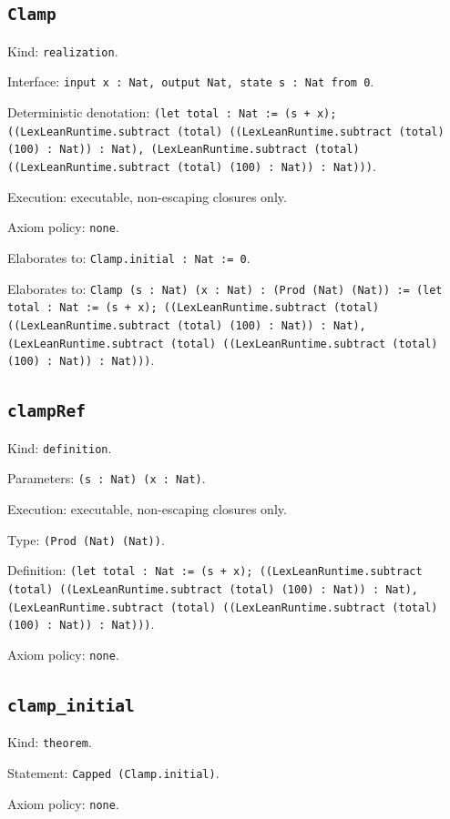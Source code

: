 \documentclass[11pt]{article}
\begin{document}
\subsection*{\texttt{Clamp}}
\noindent Kind: \texttt{realization}.\par
\noindent Interface: \texttt{input x : Nat, output Nat, state s : Nat from 0}.\par
\noindent Deterministic denotation: \texttt{(let total : Nat := (s + x); ((LexLeanRuntime.subtract (total) ((LexLeanRuntime.subtract (total) (100) : Nat)) : Nat), (LexLeanRuntime.subtract (total) ((LexLeanRuntime.subtract (total) (100) : Nat)) : Nat)))}.\par
\noindent Execution: executable, non-escaping closures only.\par
\noindent Axiom policy: \texttt{none}.\par
\noindent Elaborates to: \texttt{Clamp.initial : Nat := 0}.\par
\noindent Elaborates to: \texttt{Clamp (s : Nat) (x : Nat) : (Prod (Nat) (Nat)) := (let total : Nat := (s + x); ((LexLeanRuntime.subtract (total) ((LexLeanRuntime.subtract (total) (100) : Nat)) : Nat), (LexLeanRuntime.subtract (total) ((LexLeanRuntime.subtract (total) (100) : Nat)) : Nat)))}.\par
\subsection*{\texttt{clampRef}}
\noindent Kind: \texttt{definition}.\par
\noindent Parameters: \texttt{(s : Nat) (x : Nat)}.\par
\noindent Execution: executable, non-escaping closures only.\par
\noindent Type: \texttt{(Prod (Nat) (Nat))}.\par
\noindent Definition: \texttt{(let total : Nat := (s + x); ((LexLeanRuntime.subtract (total) ((LexLeanRuntime.subtract (total) (100) : Nat)) : Nat), (LexLeanRuntime.subtract (total) ((LexLeanRuntime.subtract (total) (100) : Nat)) : Nat)))}.\par
\noindent Axiom policy: \texttt{none}.\par
\subsection*{\texttt{clamp\_initial}}
\noindent Kind: \texttt{theorem}.\par
\noindent Statement: \texttt{Capped (Clamp.initial)}.\par
\noindent Axiom policy: \texttt{none}.\par
\end{document}
